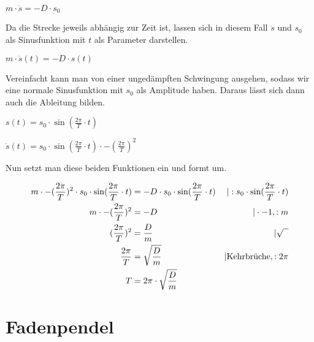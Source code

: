\documentclass{article}
\begin{document}
\large
$m \cdot \ddot{s} = -D \cdot s_0$
\vspace{0.5cm}

\normalsize
Da die Strecke jeweils abhängig zur Zeit ist, lassen sich in diesem Fall $\ddot{s}$ und
$s_0$ als Sinusfunktion mit $t$ als Parameter darstellen.

\large
$m \cdot \ddot{s}(t) = -D \cdot s(t)$
\vspace{0.5cm}

\normalsize
Vereinfacht kann man von einer ungedämpften Schwingung ausgehen, sodass wir eine
normale Sinusfunktion mit $s_0$ als Amplitude haben. Daraus lässt sich dann auch die
Ableitung bilden.

\large
$s(t) = s_0 \cdot \sin (\frac{2\pi}{T} \cdot t)$

$\ddot{s}(t) = s_0 \cdot \sin (\frac{2\pi}{T} \cdot t) \cdot -(\frac{2\pi}{T})^2$
\vspace{0.5cm}

\normalsize
Nun setzt man diese beiden Funktionen ein und formt um.

\large
\begin{align*}
    m \cdot -(\frac{2\pi}{T})^2 \cdot s_0 \cdot \sin (\frac{2\pi}{T} \cdot t) & =
    -D \cdot s_0 \cdot \sin (\frac{2\pi}{T} \cdot t)
                                                                              & | : s_0 \cdot \sin (\frac{2\pi}{T} \cdot t) \\
    m \cdot -(\frac{2\pi}{T})^2                                               & =
    -D                                                                        & | \cdot -1, : m                             \\
    (\frac{2\pi}{T})^2                                                        & =
    \frac{D}{m}                                                               & | \sqrt{\phantom{x}}                        \\
    \frac{2\pi}{T}                                                            & =
    \sqrt{\frac{D}{m}}                                                        & | \text{\normalsize Kehrbrüche}, : 2\pi     \\
    T                                                                         & =
    2\pi \cdot \sqrt{\frac{D}{m}}
\end{align*}

\clearpage

\section*{Fadenpendel}
\end{document}
